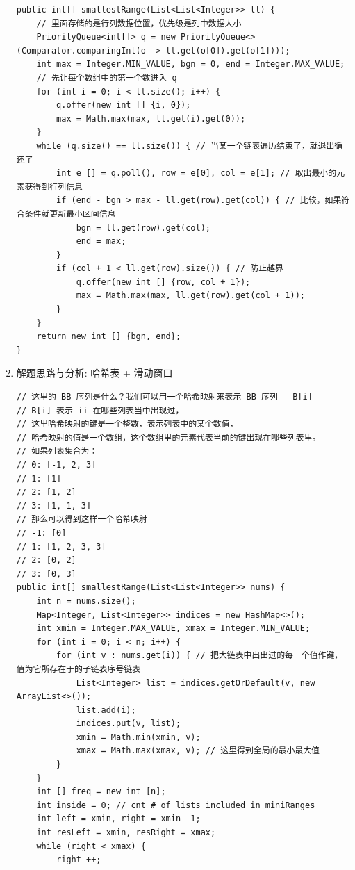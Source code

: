 \documentclass[9pt, b5paaper]{book}
\begin{document}
\begin{enumerate}
\begin{itemize}
\end{itemize}
\begin{verbatim}
public int[] smallestRange(List<List<Integer>> ll) {
    // 里面存储的是行列数据位置，优先级是列中数据大小
    PriorityQueue<int[]> q = new PriorityQueue<>(Comparator.comparingInt(o -> ll.get(o[0]).get(o[1])));
    int max = Integer.MIN_VALUE, bgn = 0, end = Integer.MAX_VALUE;
    // 先让每个数组中的第一个数进入 q
    for (int i = 0; i < ll.size(); i++) {
        q.offer(new int [] {i, 0});
        max = Math.max(max, ll.get(i).get(0));
    }
    while (q.size() == ll.size()) { // 当某一个链表遍历结束了，就退出循还了
        int e [] = q.poll(), row = e[0], col = e[1]; // 取出最小的元素获得到行列信息
        if (end - bgn > max - ll.get(row).get(col)) { // 比较，如果符合条件就更新最小区间信息
            bgn = ll.get(row).get(col);
            end = max;
        }
        if (col + 1 < ll.get(row).size()) { // 防止越界
            q.offer(new int [] {row, col + 1});
            max = Math.max(max, ll.get(row).get(col + 1));
        }
    }
    return new int [] {bgn, end};
}
\end{verbatim}
\item 解题思路与分析: 哈希表 + 滑动窗口
\label{sec-5-0-6-2}
\begin{verbatim}
// 这里的 BB 序列是什么？我们可以用一个哈希映射来表示 BB 序列—— B[i]
// B[i] 表示 ii 在哪些列表当中出现过，
// 这里哈希映射的键是一个整数，表示列表中的某个数值，
// 哈希映射的值是一个数组，这个数组里的元素代表当前的键出现在哪些列表里。
// 如果列表集合为：
// 0: [-1, 2, 3]
// 1: [1]
// 2: [1, 2]
// 3: [1, 1, 3]
// 那么可以得到这样一个哈希映射
// -1: [0]
// 1: [1, 2, 3, 3]
// 2: [0, 2]
// 3: [0, 3]
public int[] smallestRange(List<List<Integer>> nums) {
    int n = nums.size();
    Map<Integer, List<Integer>> indices = new HashMap<>();
    int xmin = Integer.MAX_VALUE, xmax = Integer.MIN_VALUE;
    for (int i = 0; i < n; i++) {
        for (int v : nums.get(i)) { // 把大链表中出出过的每一个值作键，值为它所存在于的子链表序号链表
            List<Integer> list = indices.getOrDefault(v, new ArrayList<>());
            list.add(i);
            indices.put(v, list);
            xmin = Math.min(xmin, v);
            xmax = Math.max(xmax, v); // 这里得到全局的最小最大值
        }
    }
    int [] freq = new int [n];
    int inside = 0; // cnt # of lists included in miniRanges
    int left = xmin, right = xmin -1;
    int resLeft = xmin, resRight = xmax;
    while (right < xmax) {
        right ++;

\end{verbatim}
\end{enumerate}
\end{document}
